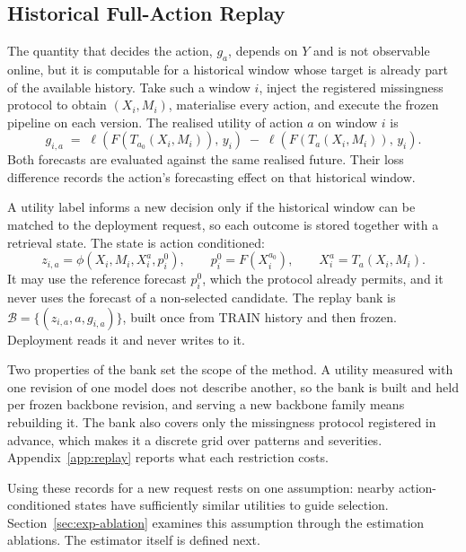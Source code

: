 \documentclass{article}
\newcommand{\calB}{\mathcal{B}}
\newcommand{\loss}{\ell}
\begin{document}
\subsection{Historical Full-Action Replay}
\label{sec:method-replay}
The quantity that decides the action, $g_a$, depends on $Y$ and is not observable online, but it
is computable for a historical window whose target is already part of the available history.
Take such a window $i$, inject the registered missingness protocol to obtain $(X_i, M_i)$,
materialise every action, and execute the frozen pipeline on each version. The realised utility
of action $a$ on window $i$ is
\begin{equation}
  g_{i,a} \;=\; \loss\!\left(F(T_{a_0}(X_i, M_i)),\, y_i\right)
  \;-\; \loss\!\left(F(T_{a}(X_i, M_i)),\, y_i\right).
  \label{eq:replay-gain}
\end{equation}
Both forecasts are evaluated against the same realised future. Their loss difference records
the action's forecasting effect on that historical window.

A utility label informs a new decision only if the historical window can be matched to the
deployment request, so each outcome is stored together with a retrieval state. The state is
action conditioned:
\begin{equation}
  z_{i,a} = \phi(X_i, M_i, X_i^{a}, p_i^{0}),
  \qquad p_i^{0} = F(X_i^{a_0}),
  \qquad X_i^{a} = T_a(X_i, M_i).
  \label{eq:state}
\end{equation}
It may use the reference forecast $p_i^0$, which the
protocol already permits, and it never uses the forecast of a non-selected candidate. The
replay bank is $\calB = \{(z_{i,a}, a, g_{i,a})\}$, built once from TRAIN history and then
frozen. Deployment reads it and never writes to it.

Two properties of the bank set the scope of the method. A utility measured with one revision
of one model does not describe another, so the bank is built and held per frozen backbone
revision, and serving a new backbone family means rebuilding it. The bank also covers only the
missingness protocol registered in advance, which makes it a discrete grid over patterns and
severities.
Appendix~\ref{app:replay} reports what each restriction costs.

Using these records for a new request rests on one assumption: nearby action-conditioned
states have sufficiently similar utilities to guide selection. Section~\ref{sec:exp-ablation}
examines this assumption through the estimation ablations. The estimator itself is defined next.
\end{document}
